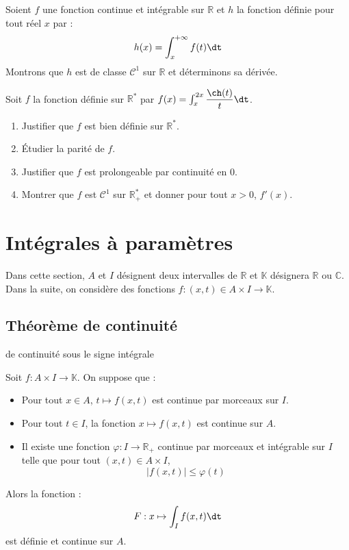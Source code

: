 \documentclass[a4paper,10pt]{report}
\begin{document}
\medskip

\begin{Exemple} Soient $f$ une fonction continue et intégrable sur $\mathbb{R}$ et $h$ la fonction définie pour tout réel $x$ par :
$$ h(x) = \int_x^{+ \infty} f(t) \dt$$
Montrons que $h$ est de classe $\mathcal{C}^1$ sur $\mathbb{R}$ et déterminons sa dérivée.



\vspace{11.5cm}
\end{Exemple}

\begin{ApplicationDirecte} Soit $f$ la fonction définie sur $\mathbb{R}^*$ par $f(x) = \int_{x}^{2x} \dfrac{\ch(t)}{t} \dt$.

\begin{enumerate}
\item Justifier que $f$ est bien définie sur $\mathbb{R}^*$. 
\item Étudier la parité de $f$. 
\item Justifier que $f$ est prolongeable par continuité en $0$.
\item Montrer que $f$ est $\mathcal{C}^1$ sur $\mathbb{R}_+^{*}$ et donner pour tout $x>0$, $f'(x)$.
\end{enumerate}
\end{ApplicationDirecte}

\section{Intégrales à paramètres}

Dans cette section, $A$ et $I$ désignent deux intervalles de $\mathbb{R}$ et $\mathbb{K}$ désignera $\mathbb{R}$ ou $\mathbb{C}$. Dans la suite, on considère des fonctions $f : (x,t) \in A \times I \rightarrow \mathbb{K}$.

\subsection{Théorème de continuité}

\begin{Theoreme}{de continuité sous le signe intégrale}

Soit $f : A \times I \rightarrow \mathbb{K}$. On suppose que :
\begin{itemize}
\item Pour tout $x \in A$, $t \mapsto f(x,t)$ est continue par morceaux sur $I$.
\item Pour tout $t \in I$, la fonction $x \mapsto f(x,t)$ est continue sur $A$.
\item Il existe une fonction $\varphi : I \rightarrow \mathbb{R}_+$ continue par morceaux et intégrable sur $I$ telle que pour tout $(x,t) \in A \times I$,
$$ \vert f(x,t) \vert \leq \varphi(t)$$
\end{itemize}
Alors la fonction :
$$ F : x \mapsto \int_{I} f(x,t) \dt$$
est définie et continue sur $A$.
\end{Theoreme}
\end{document}
